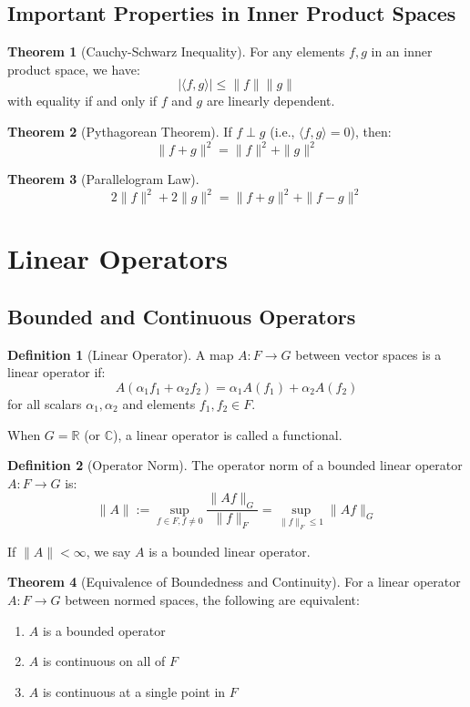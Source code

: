 \documentclass[12pt,a4paper]{article}
\theoremstyle{definition}
\newtheorem{definition}{Definition}[section]
\newtheorem{theorem}{Theorem}[section]
\begin{document}
\subsection{Important Properties in Inner Product Spaces}

\begin{theorem}[Cauchy-Schwarz Inequality]
For any elements $f, g$ in an inner product space, we have:
\[
|\langle f, g \rangle| \leq \|f\| \|g\|
\]
with equality if and only if $f$ and $g$ are linearly dependent.
\end{theorem}

\begin{theorem}[Pythagorean Theorem]
If $f \perp g$ (i.e., $\langle f, g \rangle = 0$), then:
\[
\|f + g\|^2 = \|f\|^2 + \|g\|^2
\]
\end{theorem}

\begin{theorem}[Parallelogram Law]
\[
2\|f\|^2 + 2\|g\|^2 = \|f + g\|^2 + \|f - g\|^2
\]
\end{theorem}

\section{Linear Operators}

\subsection{Bounded and Continuous Operators}

\begin{definition}[Linear Operator]
A map $A: F \to G$ between vector spaces is a linear operator if:
\[
A(\alpha_1 f_1 + \alpha_2 f_2) = \alpha_1 A(f_1) + \alpha_2 A(f_2)
\]
for all scalars $\alpha_1, \alpha_2$ and elements $f_1, f_2 \in F$.
\end{definition}

When $G = \mathbb{R}$ (or $\mathbb{C}$), a linear operator is called a functional.

\begin{definition}[Operator Norm]
The operator norm of a bounded linear operator $A : F \to G$ is:
\[
\|A\| := \sup_{f \in F, f \neq 0} \frac{\|A f\|_G}{\|f\|_F} = \sup_{\|f\|_F \leq 1} \|A f\|_G
\]

If $\|A\| < \infty$, we say $A$ is a bounded linear operator.
\end{definition}

\begin{theorem}[Equivalence of Boundedness and Continuity]
For a linear operator $A : F \to G$ between normed spaces, the following are equivalent:

\begin{enumerate}
    \item $A$ is a bounded operator
    \item $A$ is continuous on all of $F$
    \item $A$ is continuous at a single point in $F$
\end{enumerate}
\end{theorem}
\end{document}
